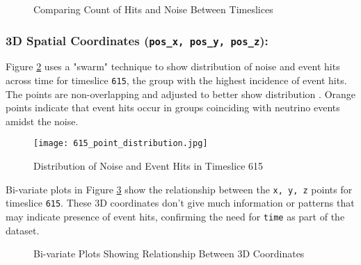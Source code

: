 \begin{figure}[ht!]   
\centering
{}

\caption{Comparing Count of Hits and Noise Between Timeslices}
\label{fig:kde_comparing_groups}
\end{figure}

\subsubsection*{3D Spatial Coordinates (\texttt{pos\_x, pos\_y, pos\_z}):} 
Figure \ref{fig:615_points} uses a "swarm" technique to show distribution of noise and event hits across time for timeslice \texttt{615}, the group with the highest incidence of event hits. The points are non-overlapping and adjusted to better show distribution \cite{waskom2020seaborn}. Orange points indicate that event hits occur in groups coinciding with neutrino events amidst the noise. 

\begin{figure}[ht!]
    \centering
    \texttt{[image: 615\_point\_distribution.jpg]}
    \caption{Distribution of Noise and Event Hits in Timeslice 615}
    \label{fig:615_points}
\end{figure}

Bi-variate plots in Figure \ref{fig:x_y_z} show the relationship between the \texttt{x, y, z} points for timeslice \texttt{615}. These 3D coordinates don't give much information or patterns that may indicate presence of event hits, confirming the need for \texttt{time} as part of the dataset.

\begin{figure}[ht!]   
\centering
{}
\caption[]{Bi-variate Plots Showing Relationship Between 3D Coordinates}
\label{fig:x_y_z}
\end{figure}

